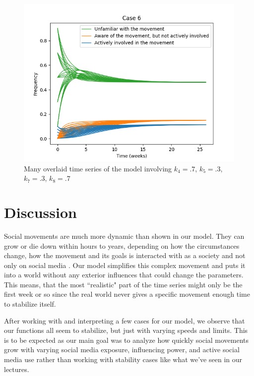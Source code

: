 \documentclass{article}
\begin{document}
    \begin{figure}[H]

        \centering
        \includegraphics[width=\textwidth]{simulation/plots/case6.png}   
        \caption{Many overlaid time series of the model involving \mbox{$k_4=.7$}, \mbox{$k_5=.3$}, \mbox{$k_7=.3$}, \mbox{$k_8=.7$}}
        \label{fig:case6}
    \end{figure}

    \section{Discussion}
    

    Social movements are much more dynamic than shown in our model. They can grow or die down within hours to years, depending on how the circumstances change, how the movement and its goals is interacted with as a society and not only on social media \cite{hiller_reconceptualization_1975}. Our model simplifies this complex movement and puts it into a world without any exterior influences that could change the parameters. This means, that the most ``realistic" part of the time series might only be the first week or so since the real world never gives a specific movement enough time to stabilize itself.
    
    After working with and interpreting a few cases for our model, we observe that our functions all seem to stabilize, but just with varying speeds and limits. This is to be expected as our main goal was to analyze how quickly social movements grow with varying social media exposure, influencing power, and active social media use rather than working with stability cases like what we've seen in our lectures. 
    
\end{document}
